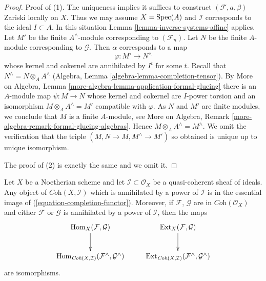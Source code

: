 \begin{proof}
Proof of (1). The uniqueness implies it suffices to construct
$(\mathcal{F}, a, \beta)$
Zariski locally on $X$. Thus we may assume $X = \mathop{\mathrm{Spec}}(A)$ and $\mathcal{I}$
corresponds to the ideal $I \subset A$. In this situation
Lemma \ref{lemma-inverse-systems-affine} applies.
Let $M'$ be the finite $A^\wedge$-module corresponding
to $(\mathcal{F}_n)$. Let $N$ be the finite $A$-module corresponding to
$\mathcal{G}$. Then $\alpha$ corresponds to a map
$$
\varphi : M' \longrightarrow N^\wedge
$$
whose kernel and cokernel are annihilated by $I^t$ for some $t$. Recall that
$N^\wedge = N \otimes_A A^\wedge$
(Algebra, Lemma \ref{algebra-lemma-completion-tensor}).
By More on Algebra, Lemma \ref{more-algebra-lemma-application-formal-glueing}
there is an $A$-module map $\psi : M \to N$ whose kernel and cokernel are
$I$-power torsion and an isomorphism
$M \otimes_A A^\wedge = M'$ compatible with $\varphi$.
As $N$ and $M'$ are finite modules, we conclude that $M$
is a finite $A$-module, see
More on Algebra, Remark \ref{more-algebra-remark-formal-glueing-algebras}.
Hence $M \otimes_A A^\wedge = M^\wedge$. We omit the verification
that the triple $(M, N \to M, M^\wedge \to M')$ so obtained
is unique up to unique isomorphism.

\medskip\noindent
The proof of (2) is exactly the same and we omit it.
\end{proof}

\begin{lemma}
\label{lemma-torsion-hom-ext}
Let $X$ be a Noetherian scheme and let $\mathcal{I} \subset \mathcal{O}_X$
be a quasi-coherent sheaf of ideals. Any object of
$\textit{Coh}(X, \mathcal{I})$ which is annihilated
by a power of $\mathcal{I}$ is in the essential image of
(\ref{equation-completion-functor}).
Moreover, if $\mathcal{F}$, $\mathcal{G}$ are in $\textit{Coh}(\mathcal{O}_X)$
and either $\mathcal{F}$ or $\mathcal{G}$ is annihilated by a power of
$\mathcal{I}$, then the maps
$$
\xymatrix{
\Hom_X(\mathcal{F}, \mathcal{G}) \ar[d] &
\Ext_X(\mathcal{F}, \mathcal{G}) \ar[d] \\
\Hom_{\textit{Coh}(X, \mathcal{I})}(\mathcal{F}^\wedge, \mathcal{G}^\wedge) &
\Ext_{\textit{Coh}(X, \mathcal{I})}(\mathcal{F}^\wedge, \mathcal{G}^\wedge)
}
$$
are isomorphisms.
\end{lemma}

